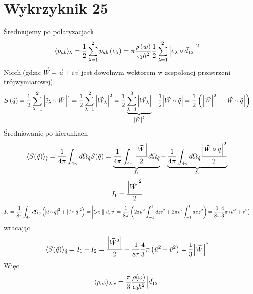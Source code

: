 \documentclass[a4paper,12pt]{article}
\begin{document}
\section{Wykrzyknik 25}
Średniujemy po polaryzacjach
\begin{equation*}
  \langle p_{ab} \rangle_\lambda = \frac{1}{2} \sum_{\lambda=1}^{2} p_{ab}\left(
  \hat{e}_\lambda \right) = \pi \frac{\rho\left(w\right)}{\epsilon_0 \hbar^2}
  \frac{1}{2}\sum_{\lambda=1}^2 \abs{\hat{e}_\lambda \circ \vec{d}_{12}}^2
\end{equation*}
Niech (gdzie $\vec{W} = \vec{u} + i\vec{v}$ jest dowolnym wektorem w zespolonej przestrzeni trójwymiarowej)
\begin{equation*}
  S\left( \hat{q} \right) = \frac{1}{2}\sum_{\lambda=1}^2 \abs{\hat{e}_\lambda
  \circ \vec{W}}^2 = \frac{1}{2} \sum_{\lambda=1}^2 \abs{\vec{W}_\lambda}^2 =
  \frac{1}{2} \underbrace{\sum_{\lambda=1}^3 \abs{\vec{W_\lambda}}}_{\abs{\vec{W}}^2} - \frac{1}{2}\abs{\vec{W}
    \circ \hat{q}} = \frac{1}{2} \left( \abs{\vec{W}}^2 - \abs{\vec{W} \circ
	  \hat{q}} \right) 
\end{equation*}
Średniowanie po kierunkach
\begin{equation*}
  \langle S(\hat{q}) \rangle_{\hat{q}} = \frac{1}{4\pi} \int_{4\pi} d\Omega
  _{\hat{q}}
  S(\hat{q}) = \underbrace{\frac{1}{4\pi} \int_{4\pi}
  \frac{\abs{\vec{W}}}{2}d\Omega_{\hat{q}}}_{I_1}
  - \underbrace{\frac{1}{4\pi} \int_{4\pi} d\Omega_{\hat{q}}
  \frac{\abs{\vec{W} \circ \hat{q}}^2}{2}}_{I_2}
\end{equation*}
\begin{equation*}
  I_1 = \frac{\abs{\vec{W}}^2}{2}
\end{equation*}
\begin{equation*}
  I_2 = \frac{1}{8\pi} \int_{4\pi} d\Omega_{\hat{q}} \left( \abs{\vec{u} \circ
  \hat{q} }^2 + \abs{\vec{v} \circ \hat{q} }^2 \right) = \bigg \vert Oz
  \parallel \vec{u}, \vec{v} \bigg \vert = \frac{1}{8\pi} \left(  2\pi u^2 \int_{-1}^1
  dzz^2 + 2\pi v^2 \int_{-1}^1
dzz^2 \right) = \frac{1}{8\pi} \frac{4}{3}\pi \left( \vec{u}^2 + \vec{v}^2 \right)
\end{equation*}
wracając
\begin{equation*}
  \langle S(\hat{q}) \rangle_{\hat{q}} = I_1 + I_2 = \frac{\abs{\vec{W}^2}}{2} -
  \frac{1}{8\pi} \frac{4}{3}\pi \left( \vec{u}^2 + \vec{v}^2 \right) =
  \frac{1}{3} \abs{\vec{W}}^2
\end{equation*}
Więc
\begin{equation*}
  \langle p_{ab} \rangle_{\lambda, \hat{q}} = \frac{\pi}{3}
  \frac{\rho(\omega)}{\epsilon_0 \hbar^2} \abs{\vec{d}_{12}} 
\end{equation*}
\end{document}
